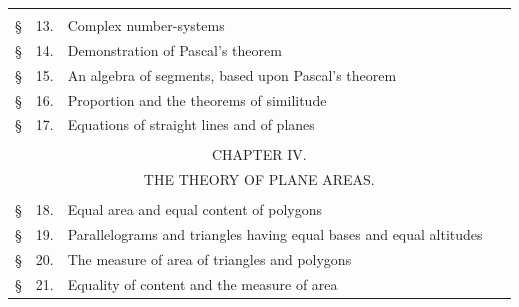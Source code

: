 \documentclass[11pt,oneside]{book}
\begin{document}
\begin{tabular}[\linewidth]{l@{}rl@{\ }r}
\multicolumn{4}{c}{}\\
\S &13. &Complex number-systems~\dotfill &\pageref{p13}\\
\S &14. &Demonstration of Pascal's theorem~\dotfill &\pageref{p14}\\
\S &15. &An algebra of segments, based upon Pascal's theorem~\dotfill &\pageref{p15}\\
\S &16. &Proportion and the theorems of similitude~\dotfill &\pageref{p16}\\
\S &17. &Equations of straight lines and of planes~\dotfill &\pageref{p17}\\
\multicolumn{4}{c}{}\\
\multicolumn{4}{c}{CHAPTER IV.}\\
\multicolumn{4}{c}{\small THE THEORY OF PLANE AREAS.}\\
\multicolumn{4}{c}{}\\
\S &18. &Equal area and equal content of polygons~\dotfill &\pageref{p18}\\
\S &19. &Parallelograms and triangles having equal bases and equal altitudes~\dotfill &\pageref{p19}\\
\S &20. &The measure of area of triangles and polygons~\dotfill &\pageref{p20}\\
\S &21. &Equality of content and the measure of area~\dotfill &\pageref{p21}\\
\end{tabular}
\newpage
\end{document}
